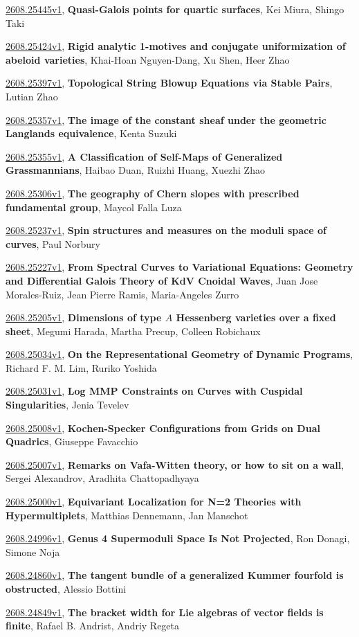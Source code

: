 \documentclass[9pt, a4paper]{article}
\theoremstyle{plain}
\theoremstyle{definition}
\theoremstyle{remark}
\newcommand{\arxiv}[3]{\href{https://arxiv.org/abs/#1}{#1}, \textbf{\textcolor{arxivblue}{#2}}, #3}
\begin{document}
\arxiv{2608.25445v1}{Quasi-Galois points for quartic surfaces}{Kei Miura, Shingo Taki}

\arxiv{2608.25424v1}{Rigid analytic 1-motives and conjugate uniformization of abeloid varieties}{Khai-Hoan Nguyen-Dang, Xu Shen, Heer Zhao}

\arxiv{2608.25397v1}{Topological String Blowup Equations via Stable Pairs}{Lutian Zhao}

\arxiv{2608.25357v1}{The image of the constant sheaf under the geometric Langlands equivalence}{Kenta Suzuki}

\arxiv{2608.25355v1}{A Classification of Self-Maps of Generalized Grassmannians}{Haibao Duan, Ruizhi Huang, Xuezhi Zhao}

\arxiv{2608.25306v1}{The geography of Chern slopes with prescribed fundamental group}{Maycol Falla Luza}

\arxiv{2608.25237v1}{Spin structures and measures on the moduli space of curves}{Paul Norbury}

\arxiv{2608.25227v1}{From Spectral Curves to Variational Equations: Geometry and Differential Galois Theory of KdV Cnoidal Waves}{Juan Jose Morales-Ruiz, Jean Pierre Ramis, Maria-Angeles Zurro}

\arxiv{2608.25205v1}{Dimensions of type $A$ Hessenberg varieties over a fixed sheet}{Megumi Harada, Martha Precup, Colleen Robichaux}

\arxiv{2608.25034v1}{On the Representational Geometry of Dynamic Programs}{Richard F. M. Lim, Ruriko Yoshida}

\arxiv{2608.25031v1}{Log MMP Constraints on Curves with Cuspidal Singularities}{Jenia Tevelev}

\arxiv{2608.25008v1}{Kochen-Specker Configurations from Grids on Dual Quadrics}{Giuseppe Favacchio}

\arxiv{2608.25007v1}{Remarks on Vafa-Witten theory, or how to sit on a wall}{Sergei Alexandrov, Aradhita Chattopadhyaya}

\arxiv{2608.25000v1}{Equivariant Localization for N=2 Theories with Hypermultiplets}{Matthias Dennemann, Jan Manschot}

\arxiv{2608.24996v1}{Genus 4 Supermoduli Space Is Not Projected}{Ron Donagi, Simone Noja}

\arxiv{2608.24860v1}{The tangent bundle of a generalized Kummer fourfold is obstructed}{Alessio Bottini}

\arxiv{2608.24849v1}{The bracket width for Lie algebras of vector fields is finite}{Rafael B. Andrist, Andriy Regeta}
\end{document}
